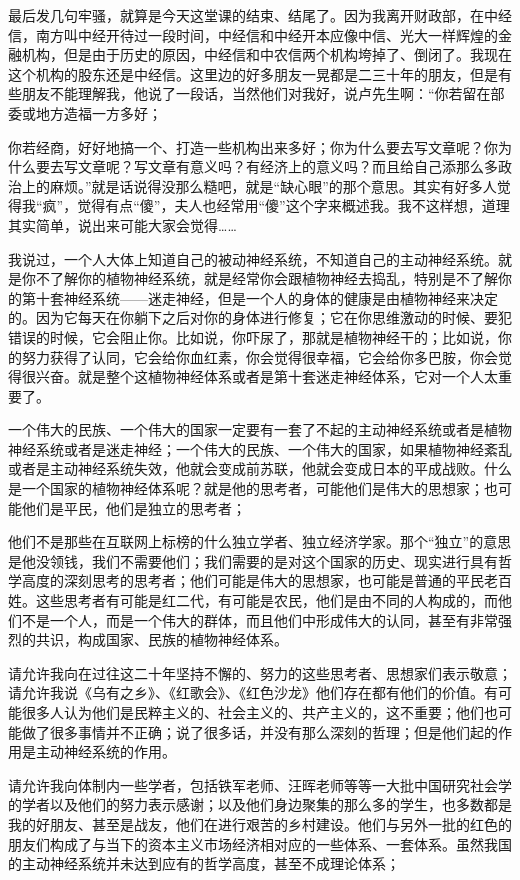 \documentclass[UTF8, 12pt, a4paper]{ctexrep}
\begin{document}
最后发几句牢骚，就算是今天这堂课的结束、结尾了。因为我离开财政部，在中经信，南方叫中经开待过一段时间，中经信和中经开本应像中信、光大一样辉煌的金融机构，但是由于历史的原因，中经信和中农信两个机构垮掉了、倒闭了。我现在这个机构的股东还是中经信。这里边的好多朋友一晃都是二三十年的朋友，但是有些朋友不能理解我，他说了一段话，当然他们对我好，说卢先生啊：“你若留在部委或地方造福一方多好；

你若经商，好好地搞一个、打造一些机构出来多好；你为什么要去写文章呢？你为什么要去写文章呢？写文章有意义吗？有经济上的意义吗？而且给自己添那么多政治上的麻烦。”就是话说得没那么糙吧，就是“缺心眼”的那个意思。其实有好多人觉得我“疯”，觉得有点“傻”，夫人也经常用“傻”这个字来概述我。我不这样想，道理其实简单，说出来可能大家会觉得……

我说过，一个人大体上知道自己的被动神经系统，不知道自己的主动神经系统。就是你不了解你的植物神经系统，就是经常你会跟植物神经去捣乱，特别是不了解你的第十套神经系统——迷走神经，但是一个人的身体的健康是由植物神经来决定的。因为它每天在你躺下之后对你的身体进行修复；它在你思维激动的时候、要犯错误的时候，它会阻止你。比如说，你吓尿了，那就是植物神经干的；比如说，你的努力获得了认同，它会给你血红素，你会觉得很幸福，它会给你多巴胺，你会觉得很兴奋。就是整个这植物神经体系或者是第十套迷走神经体系，它对一个人太重要了。

一个伟大的民族、一个伟大的国家一定要有一套了不起的主动神经系统或者是植物神经系统或者是迷走神经；一个伟大的民族、一个伟大的国家，如果植物神经紊乱或者是主动神经系统失效，他就会变成前苏联，他就会变成日本的平成战败。什么是一个国家的植物神经体系呢？就是他的思考者，可能他们是伟大的思想家；也可能他们是平民，他们是独立的思考者；

他们不是那些在互联网上标榜的什么独立学者、独立经济学家。那个“独立”的意思是他没领钱，我们不需要他们；我们需要的是对这个国家的历史、现实进行具有哲学高度的深刻思考的思考者；他们可能是伟大的思想家，也可能是普通的平民老百姓。这些思考者有可能是红二代，有可能是农民，他们是由不同的人构成的，而他们不是一个人，而是一个伟大的群体，而且他们中形成伟大的认同，甚至有非常强烈的共识，构成国家、民族的植物神经体系。

请允许我向在过往这二十年坚持不懈的、努力的这些思考者、思想家们表示敬意；请允许我说《乌有之乡》、《红歌会》、《红色沙龙》他们存在都有他们的价值。有可能很多人认为他们是民粹主义的、社会主义的、共产主义的，这不重要；他们也可能做了很多事情并不正确；说了很多话，并没有那么深刻的哲理；但是他们起的作用是主动神经系统的作用。

请允许我向体制内一些学者，包括铁军老师、汪晖老师等等一大批中国研究社会学的学者以及他们的努力表示感谢；以及他们身边聚集的那么多的学生，也多数都是我的好朋友、甚至是战友，他们在进行艰苦的乡村建设。他们与另外一批的红色的朋友们构成了与当下的资本主义市场经济相对应的一些体系、一套体系。虽然我国的主动神经系统并未达到应有的哲学高度，甚至不成理论体系；
\end{document}
